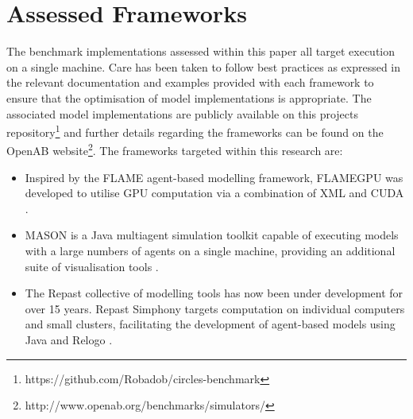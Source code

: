 \vspace{-0.3cm}
\section{Assessed Frameworks\label{sec:assessed-frameworks}}
\vspace{-0.4cm}
The benchmark implementations assessed within this paper all target execution on a single machine. Care has been taken to follow best practices as expressed in the relevant documentation and examples provided with each framework to ensure that the optimisation of model implementations is appropriate. The associated model implementations are publicly available on this projects repository\footnote{https://github.com/Robadob/circles-benchmark} and further details regarding the frameworks can be found on the OpenAB website\footnote{http://www.openab.org/benchmarks/simulators/}.
The frameworks targeted within this research are:
\begin{itemize}
\item Inspired by the FLAME agent-based modelling framework, FLAMEGPU  was developed to utilise GPU computation via a combination of XML and CUDA \cite{RR082}. 
\item MASON is a Java multiagent simulation toolkit capable of executing models with a large numbers of agents on a single machine, providing an additional suite of visualisation tools \cite{LC*04}. 
\item The Repast collective of modelling tools has now been under development for over 15 years. Repast Simphony targets computation on individual computers and small clusters, facilitating the development of agent-based models using Java and Relogo \cite{repast2013}.
\end{itemize}